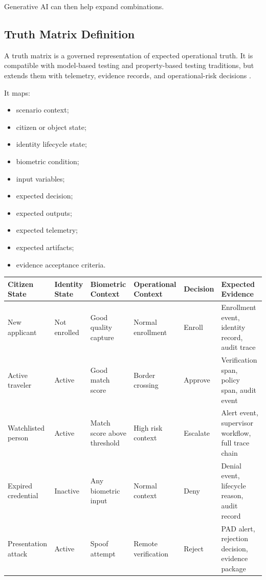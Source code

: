 \documentclass[11pt,a4paper]{article}
\begin{document}
Generative AI can then help expand combinations.

\subsection{Truth Matrix Definition}

A truth matrix is a governed representation of expected operational truth. It is compatible with model-based testing and property-based testing traditions, but extends them with telemetry, evidence records, and operational-risk decisions \cite{utting,claessen,iso29119}.

It maps:
\begin{itemize}
\item scenario context;
\item citizen or object state;
\item identity lifecycle state;
\item biometric condition;
\item input variables;
\item expected decision;
\item expected outputs;
\item expected telemetry;
\item expected artifacts;
\item evidence acceptance criteria.
\end{itemize}

\begin{longtable}{p{2.3cm}p{2.1cm}p{2.2cm}p{2.2cm}p{2.2cm}p{2.8cm}}
\toprule
\textbf{Citizen State} & \textbf{Identity State} & \textbf{Biometric Context} & \textbf{Operational Context} & \textbf{Decision} & \textbf{Expected Evidence} \\
\midrule
New applicant & Not enrolled & Good quality capture & Normal enrollment & Enroll & Enrollment event, identity record, audit trace \\
Active traveler & Active & Good match score & Border crossing & Approve & Verification span, policy span, audit event \\
Watchlisted person & Active & Match score above threshold & High risk context & Escalate & Alert event, supervisor workflow, full trace chain \\
Expired credential & Inactive & Any biometric input & Normal context & Deny & Denial event, lifecycle reason, audit record \\
Presentation attack & Active & Spoof attempt & Remote verification & Reject & PAD alert, rejection decision, evidence package \\
\bottomrule
\end{longtable}
\end{document}
